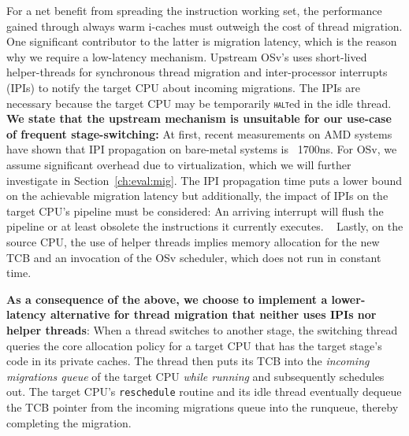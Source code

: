 \documentclass[12pt,a4paper]{book}
\begin{document}
For a net benefit from spreading the instruction working set, the performance gained through always warm i-caches must outweigh the cost of thread migration.
One significant contributor to the latter is migration latency, which is the reason why we require a low-latency mechanism.
Upstream OSv's uses short-lived helper-threads for synchronous thread migration and inter-processor interrupts (IPIs) to notify the target CPU about incoming migrations.
The IPIs are necessary because the target CPU may be temporarily \textsc{\texttt{halt}}ed in the idle thread.
\textbf{We state that the upstream mechanism is unsuitable for our use-case of frequent stage-switching:}
At first, recent measurements on AMD systems have shown that IPI propagation on bare-metal systems is ~1700ns. %
For OSv, we assume significant overhead due to virtualization, which we will further investigate in Section~\ref{ch:eval:mig}.
The IPI propagation time puts a lower bound on the achievable migration latency but additionally, the impact of IPIs on the target CPU's pipeline must be considered:
An arriving interrupt will flush the pipeline or at least obsolete the instructions it currently executes. ~\cite{ipiLatencyPopcornLinux}
Lastly, on the source CPU, the use of helper threads implies memory allocation for the new TCB and an invocation of the OSv scheduler, which does not run in constant time.

\textbf{As a consequence of the above, we choose to implement a lower-latency alternative for thread migration that neither uses IPIs nor helper threads}:
When a thread switches to another stage, the switching thread queries the core allocation policy for a target CPU that has the target stage's code in its private caches.
The thread then puts its TCB into the \emph{incoming migrations queue} of the target CPU \emph{while running} and subsequently schedules out.
The target CPU's \lstinline{reschedule} routine and its idle thread eventually dequeue the TCB pointer from the incoming migrations queue into the runqueue, thereby completing the migration.
\end{document}
